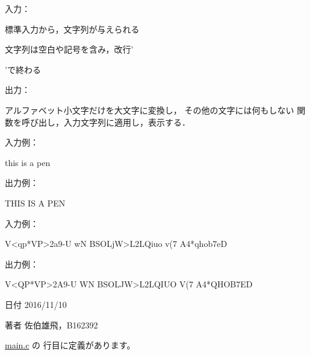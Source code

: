 入力：
\begin{DoxyItemize}
\item 標準入力から，文字列が与えられる
\item 文字列は空白や記号を含み，改行'\par
'で終わる
\end{DoxyItemize}

出力：
\begin{DoxyItemize}
\item アルファベット小文字だけを大文字に変換し， その他の文字には何もしない 関数を呼び出し，入力文字列に適用し，表示する．
\end{DoxyItemize}

入力例： \begin{DoxyVerb}this is a pen
\end{DoxyVerb}
 出力例： \begin{DoxyVerb}THIS IS A PEN
\end{DoxyVerb}
 入力例： \begin{DoxyVerb}V<qp*VP>2a9-U wN BSOLjW>L2LQiuo  v(7 A4*qhob7eD
\end{DoxyVerb}
 出力例： \begin{DoxyVerb}V<QP*VP>2A9-U WN BSOLJW>L2LQIUO  V(7 A4*QHOB7ED
\end{DoxyVerb}
 \begin{DoxyDate}{日付}
2016/11/10 
\end{DoxyDate}
\begin{DoxyAuthor}{著者}
佐伯雄飛，\-B162392 
\end{DoxyAuthor}


 \hyperlink{main_8c_source}{main.\-c} の  行目に定義があります。


